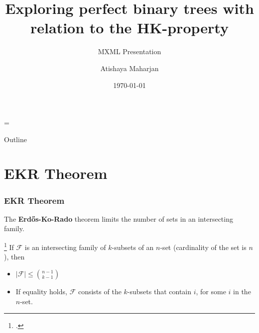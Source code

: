 \documentclass[10pt,]{beamer}
\title[HK-property | Perfect Binary Trees]{Exploring perfect binary trees with relation to the HK-property}
\subtitle{MXML Presentation} %
\author[A.M]{Atishaya Maharjan}
\date{\today}
\theoremstyle{conjectureStyle}
\theoremstyle{notationStyle}
\theoremstyle{claimStyle}
\begin{document}
\parskip = \baselineskip

\begin{frame} %
    \titlepage
\end{frame}

\begin{frame}{Outline}
    \tableofcontents
\end{frame}

\section{EKR Theorem}
\begin{frame}\frametitle{EKR Theorem}
    The \textbf{Erd\H{o}s-Ko-Rado} theorem limits the number of sets in an intersecting family.
    \begin{theorem}
        \footcite{Erds1961INTERSECTIONTF} If $\mathcal{F}$ is an intersecting family of $k$-subsets of an $n$-set (cardinality of the set is $n$), then
        \begin{itemize}
            \item $|\mathcal{F}| \leq \binom{n - 1}{k - 1}$
            \item If equality holds, $\mathcal{F}$ consists of the $k$-subsets that contain $i$, for some $i$ in the $n$-set.
        \end{itemize}
    \end{theorem}
\end{frame}
\end{document}
